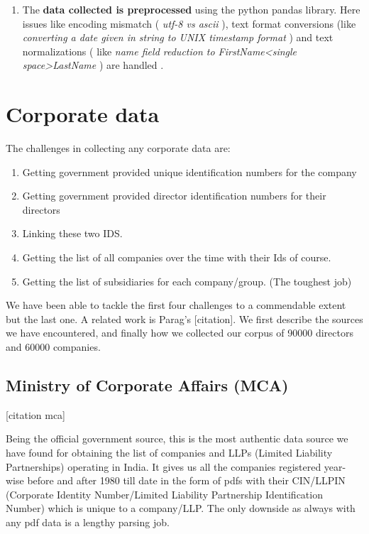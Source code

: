 \begin{enumerate}
    \item The \textbf{ data collected is preprocessed } using the python pandas library. Here issues like encoding mismatch (\emph{ utf-8 vs ascii }), text format conversions (like \emph{ converting a date given in string to UNIX timestamp format }) and text normalizations ( like \emph{ name field reduction to FirstName<single space>LastName }) are handled .

\end{enumerate}


\section{Corporate data}

The challenges in collecting any corporate data are:

\begin{enumerate}
    \item Getting government provided unique identification numbers for the company
    \item Getting government provided director identification numbers for their directors
    \item Linking these two IDS.
    \item Getting the list of all companies over the time with their Ids of course.
    \item Getting the list of subsidiaries for each company/group. (The toughest job)
\end{enumerate}  

We have been able to tackle the first four challenges to a commendable extent but the last one. A related work is Parag's [citation]. We first describe the sources we have encountered, and finally how we collected our corpus of 90000 directors and 60000 companies.

\subsection{Ministry of Corporate Affairs (MCA)}
[citation mca]

Being the official government source, this is the most authentic data source we have found for obtaining the list of companies and LLPs (Limited Liability Partnerships) operating in India. It gives us all the companies registered year-wise before and after 1980 till date in the form of pdfs with their CIN/LLPIN (Corporate Identity Number/Limited Liability Partnership Identification Number) which is unique to a company/LLP. The only downside as always with any pdf data is a lengthy parsing job.

